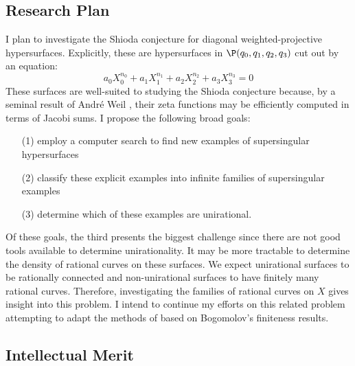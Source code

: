 \documentclass[11pt]{amsart}
\begin{document}
\subsection*{Research Plan}

I plan to investigate the Shioda conjecture for diagonal weighted-projective hypersurfaces. Explicitly, these are hypersurfaces in $\P(q_0, q_1, q_2, q_3)$ cut out by an equation:
\[ a_0 X_0^{n_0} + a_1 X_1^{n_1} + a_2 X_2^{n_2} + a_3 X_3^{n_3} = 0 \]
These surfaces are well-suited to studying the Shioda conjecture because, by a seminal result of Andr\'{e} Weil \cite{weil_counting}, their zeta functions may be efficiently computed in terms of Jacobi sums. I propose the following broad goals:
\begin{enumerate}
\item[(1)] employ a computer search to find new examples of supersingular hypersurfaces
\item[(2)] classify these explicit examples into infinite families of supersingular examples
\item[(3)] determine which of these examples are unirational.
\end{enumerate}
Of these goals, the third presents the biggest challenge since there are not good tools available to determine unirationality. It may be more tractable to determine the density of rational curves on these surfaces. We expect unirational surfaces to be rationally connected and non-unirational surfaces to have finitely many rational curves. Therefore, investigating the families of rational curves on $X$ gives insight into this problem. I intend to continue my efforts on this related problem attempting to adapt the methods of \cite{lang} based on Bogomolov's finiteness results.

\subsection*{Intellectual Merit}
\end{document}
